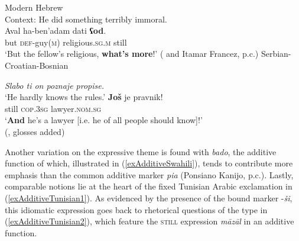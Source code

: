 \begin{exe}
	\ex Modern Hebrew\label{exAdditiveHebrewReligious}\\
	Context: He did something terribly immoral.\\
	\gll Aval ha-ben\rq{}adam dati \textbf{ʕod}.\\
	but \textsc{def}-guy(\textsc{m}) religious.\textsc{sg}.\textsc{m} still\\
	\glt \lq But the fellow’s religious, \textbf{what’s more}!\rq{ }(\cite[537]{Glinert1989} and Itamar Francez, p.c.)
	\ex Serbian-Croatian-Bosnian\label{exAdditiveBCMSLawyer}
	\begin{xlist}
		 \textit{Slabo ti on poznaje propise.}\\
		\lq He hardly knows the rules.\rq{}
		\gll \textbf{Još} je pravnik!\\
		still \textsc{cop}.3\textsc{sg} lawyer.\textsc{nom}.\textsc{sg}\\
		\glt \lq \textbf{And} he's a lawyer [i.e. he of all people should know]!\rq{}\\(\cite[s.v. \textit{još}]{HJP}, glosses added)		
	\end{xlist}
\end{exe}

Another variation on the expressive theme is found with  \textit{bado}, the additive function of which, illustrated in (\ref{exAdditiveSwahili}), tends to contribute more emphasis than the common additive marker \textit{pia} (Ponsiano Kanijo, p.c.). Lastly, comparable notions lie at the heart of the fixed Tunisian Arabic exclamation in (\ref{exAdditiveTunisian1}). As evidenced by the presence of the bound  marker \mbox{-\textit{ši}}, this idiomatic expression goes back to rhetorical questions of the type in (\ref{exAdditiveTunisian2}), which feature the \textsc{still} expression \textit{māzāl} in an additive function.

